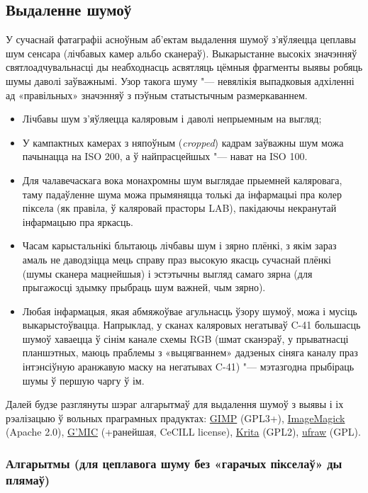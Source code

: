 \documentclass[10pt, a5paper]{article}
\begin{document}
\subsection*{Выдаленне шумоў}

У сучаснай фатаграфіі асноўным аб’ектам выдалення шумоў з’яўляецца цеплавы шум сенсара (лічбавых камер альбо сканераў). Выкарыстанне высокіх значэнняў святлоадчувальнасці ды неабходнасць асвятляць цёмныя фрагменты выявы робяць шумы даволі заўважнымі. Узор такога шуму "--- невялікія выпадковыя адхіленні ад «правільных» значэнняў з пэўным статыстычным размеркаваннем.

\begin{itemize}
  \item Лічбавы шум з’яўляецца каляровым і даволі непрыемным на выгляд;
  \item У кампактных камерах з няпоўным (\emph{cropped}) кадрам заўважны шум можа пачынацца на ISO 200, а ў найпрасцейшых "--- нават на ISO 100.
  \item Для чалавечаскага вока монахромны шум выглядае прыемней каляровага, таму падаўленне шума можа прымяняцца толькі да інфармацыі пра колер піксела (як правіла, ў каляровай прасторы LAB), пакідаючы некранутай інфармацыю пра яркасць.
  \item Часам карыстальнікі блытаюць лічбавы шум і зярно плёнкі, з якім зараз амаль не даводзіцца мець справу праз высокую якасць сучаснай плёнкі (шумы сканера мацнейшыя) і эстэтычны выгляд самаго зярна (для прыгажосці здымку прыбраць шум важней, чым зярно).
  \item Любая інфармацыя, якая абмяжоўвае агульнасць ўзору шумоў, можа і мусіць выкарыстоўвацца. Напрыклад, у сканах каляровых негатываў C-41  большасць шумоў хаваецца ў сінім канале схемы RGB (шмат сканэраў, у прыватнасці планшэтных, маюць праблемы з «выцягваннем» дадзеных сіняга каналу праз інтэнсіўную аранжавую маску на негатывах C-41) "--- мэтазгодна прыбіраць шумы ў першую чаргу ў ім.
\end{itemize}

Далей будзе разглянуты шэраг алгарытмаў для выдалення шумоў з выявы і іх рэалізацыю ў вольных праграмных прадуктах: \href{http://www.gimp.org/}{GIMP} (GPL3+), \href{http://www.imagemagick.org/}{ImageMagick} (Apache 2.0), \href{http://gmic.sourceforge.net/}{G'MIC} (+ранейшая, CeCILL license), \href{http://krita.org/}{Krita} (GPL2), \href{http://ufraw.sourceforge.net/}{ufraw} (GPL).

\subsubsection*{Алгарытмы (для цеплавога шуму без «гарачых пікселаў» ды плямаў)}
\end{document}
